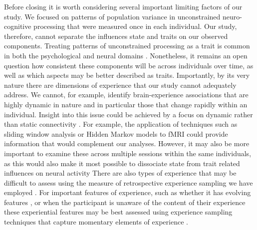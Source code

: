 Before closing it is worth considering several important limiting factors of our study. We focused on patterns of population variance in unconstrained neuro-cognitive processing that were measured once in each individual. Our study, therefore, cannot separate the influences state and traits on our observed components. Treating patterns of unconstrained processing as a trait is common in both the psychological \cite{McVay2009,Smallwood2013a} 
and neural domains \cite{Smith2015}. 
Nonetheless, it remains an open question how consistent these components will be across individuals over time, as well as which aspects may be better described as traits. Importantly, by its very nature there are dimensions of experience that our study cannot adequately address. We cannot, for example, identify brain-experience associations that are highly dynamic in nature and in particular those that change rapidly within an individual. Insight into this issue could be achieved by a focus on dynamic rather than static connectivity \cite{Kucyi2017}. 
For example, the application of techniques such as sliding window analysis \cite{Chang2010}%
or Hidden Markov models \cite{Vidaurre2017} 
to fMRI could provide information that would complement our analyses. However, it may also be more important to examine these across multiple sessions within the same individuals, as this would also make it most possible to dissociate state from trait related influences on neural activity \cite{Mueller2013}%
There are also types of experience that may be difficult to assess using the measure of retrospective experience sampling we have employed \cite{Smallwood2015}. 
For important features of experience, such as whether it has evolving features \cite{Mills2018}, 
or when the participant is unaware of the content of their experience \cite{Schooler2002}%
these experiential features may be best assessed using experience sampling techniques that capture momentary elements of experience \cite{Smallwood2013PsychologicalBulletin}. %

